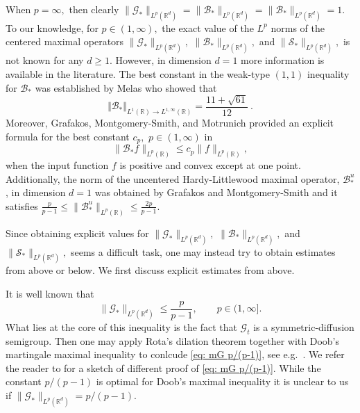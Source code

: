 \documentclass[a4paper, reqno]{amsart}
\theoremstyle{definition}
\newcommand{\R}{{\mathbb R}}
\newcommand{\mG}{\mathcal{G}}
\newcommand{\mB}{\mathcal{B}}
\newcommand{\mS}{\mathcal{S}}
\begin{document}
When $p=\infty,$ then clearly $ \|\mG_*\|_{L^p(\R^d)}=\|\mB_*\|_{L^p(\R^d)}= \|\mB_*\|_{L^p(\R^d)}=1.$ To our knowledge, for $p\in (1,\infty),$ the exact value of the $L^p$ norms of the centered maximal operators $ \|\mG_*\|_{L^p(\R^d)},$ $ \|\mB_*\|_{L^p(\R^d)},$ and $ \|\mS_*\|_{L^p(\R^d)},$ is not known for any $d\ge 1$. However, in dimension $d=1$ more information is available in the literature.  The best constant in the weak-type $(1,1)$ inequality for $\mB_*$ was established by Melas \cite{Me03} who showed that 
$$\Vert \mB_* \Vert_{L^1(\mathbb{R})\rightarrow L^{1,\infty}(\mathbb{R})}= \frac{11+\sqrt{61}}{12}~.$$ Moreover, Grafakos, Montgomery-Smith, and Motrunich \cite{GM-SM1} provided an explicit formula for the best constant $c_p,$ $p\in (1,\infty)$ in
\[
\|\mB_* f\|_{L^p(\R)}\le c_p \|f\|_{L^p(\R)},
\]
 when the input function $f$ is positive and convex except at one point. Additionally, the norm of the uncentered Hardy-Littlewood maximal operator, $\mB_\ast^u$, in dimension $d=1$ was obtained by Grafakos and Montgomery-Smith \cite{GM-S1}
  and it satisfies $\frac{p}{p-1}\leq \| \mB_\ast^u\|_{L^p(\mathbb{R})}\leq \frac{2p}{p-1}$.


Since obtaining explicit values for $\|\mG_*\|_{L^p(\R^d)},$ $\|\mB_*\|_{L^p(\R^d)},$ and $\|\mS_*\|_{L^p(\R^d)},$ seems a difficult task, one may instead try to obtain estimates from above or below. We first discuss explicit estimates from above.

It is well known that 
\begin{equation}
\label{eq: mG p/(p-1)}
\|\mG_*\|_{L^p(\R^d)}\le \frac{p}{p-1},\qquad p\in (1,\infty].
\end{equation}
What lies at the core of this inequality is the fact that $\mG_t$ is a symmetric-diffusion semigroup. Then one may apply Rota's dilation theorem together with Doob's martingale maximal inequality to conlcude \eqref{eq: mG p/(p-1)}, see e.g.\ \cite[Chapter IV, Section 4, p.\ 106]{St_topics}. We refer the reader to \cite[Equation~1.20.G*]{DGM18} for a sketch of different proof of \eqref{eq: mG p/(p-1)}. While the constant $p/(p-1)$ is optimal for Doob's maximal inequality it is unclear to us if $\|\mG_*\|_{L^p(\R^d)}=p/(p-1).$ 
\end{document}
